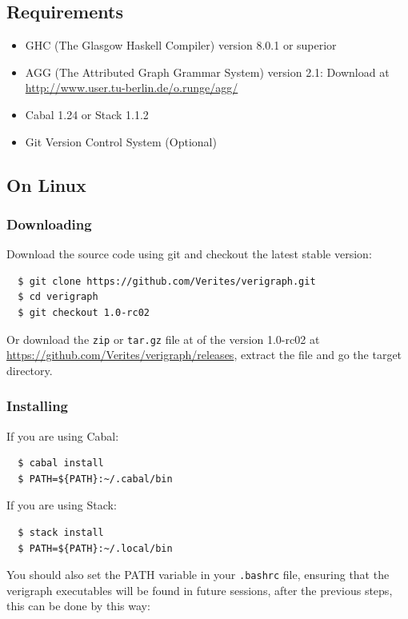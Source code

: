 \documentclass[12pt]{article}
\begin{document}
\subsection{Requirements}
\begin{itemize}
\item GHC (The Glasgow Haskell Compiler) version 8.0.1 or superior
\item AGG (The Attributed Graph Grammar System) version 2.1: Download at \url{http://www.user.tu-berlin.de/o.runge/agg/}
\item Cabal 1.24 or Stack 1.1.2
\item Git Version Control System (Optional)
\end{itemize}

\subsection{On Linux}

\subsubsection{Downloading}
Download the source code using git and checkout the latest stable version:
\begin{verbatim}
  $ git clone https://github.com/Verites/verigraph.git
  $ cd verigraph
  $ git checkout 1.0-rc02
\end{verbatim}

\noindent
Or download the \texttt{zip} or \texttt{tar.gz} file at of the version 1.0-rc02 at \url{https://github.com/Verites/verigraph/releases}, extract the file and go the target directory.

\subsubsection{Installing}

If you are using Cabal:
\begin{verbatim}
  $ cabal install
  $ PATH=${PATH}:~/.cabal/bin
\end{verbatim}

\noindent
If you are using Stack:
\begin{verbatim}
  $ stack install
  $ PATH=${PATH}:~/.local/bin
\end{verbatim}

You should also set the PATH variable in your \texttt{.bashrc} file, ensuring that the verigraph executables will be found in future sessions, after the previous steps, this can be done by this way:
\end{document}
